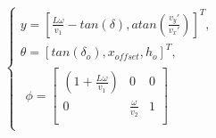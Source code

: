 \documentclass[letterpaper, 10 pt, conference]{ieeeconf}
\begin{document}
\begin{equation}
\left\{
        \begin{array}{lr}
        y = [ \frac{L\omega}{v_1}-tan(\delta), atan(\frac{v_y'}{v_x'})]^T, & \\
        \theta = [tan(\delta_o), x_{offset}, h_o]^T, & \\
        \begin{split}
            \phi = \left[
                \begin{array}{ccc}
                 (1+\frac{L\omega}{v_1})& 0 & 0 \\
                  0 & \frac{\omega}{v_2} & 1 \\
                    \end{array}
                    \right]
            \end{split}
        \end{array}
\right.
\end{equation}
\end{document}
